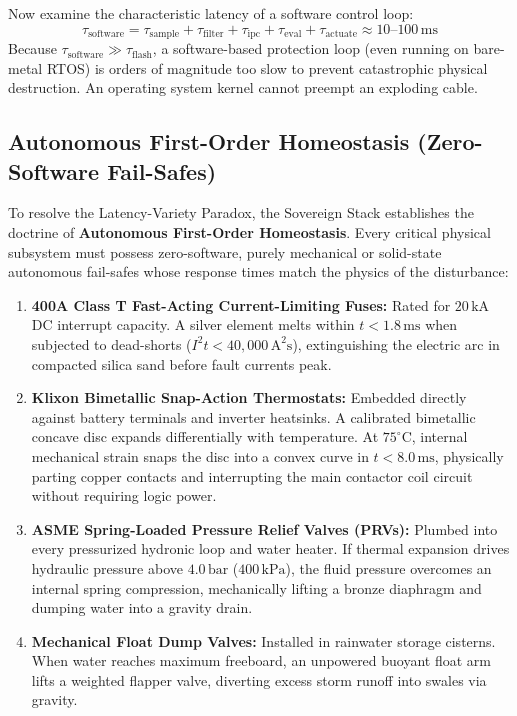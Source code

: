 Now examine the characteristic latency of a software control loop:
\begin{equation}
\tau_{\mathrm{software}} = \tau_{\mathrm{sample}} + \tau_{\mathrm{filter}} + \tau_{\mathrm{ipc}} + \tau_{\mathrm{eval}} + \tau_{\mathrm{actuate}} \approx 10\text{--}100\,\mathrm{ms}
\label{eq:software_latency}
\end{equation}
Because $\tau_{\mathrm{software}} \gg \tau_{\mathrm{flash}}$, a software-based protection loop (even running on bare-metal RTOS) is orders of magnitude too slow to prevent catastrophic physical destruction. An operating system kernel cannot preempt an exploding cable.

\subsection{Autonomous First-Order Homeostasis (Zero-Software Fail-Safes)}

To resolve the Latency-Variety Paradox, the Sovereign Stack establishes the doctrine of \textbf{Autonomous First-Order Homeostasis}. Every critical physical subsystem must possess zero-software, purely mechanical or solid-state autonomous fail-safes whose response times match the physics of the disturbance:

\begin{enumerate}
    \item \textbf{400A Class T Fast-Acting Current-Limiting Fuses:} Rated for $20\,\mathrm{kA}$ DC interrupt capacity. A silver element melts within $t < 1.8\,\mathrm{ms}$ when subjected to dead-shorts ($I^2 t < 40,000\,\mathrm{A^2 s}$), extinguishing the electric arc in compacted silica sand before fault currents peak.
    \item \textbf{Klixon Bimetallic Snap-Action Thermostats:} Embedded directly against battery terminals and inverter heatsinks. A calibrated bimetallic concave disc expands differentially with temperature. At $75^\circ\mathrm{C}$, internal mechanical strain snaps the disc into a convex curve in $t < 8.0\,\mathrm{ms}$, physically parting copper contacts and interrupting the main contactor coil circuit without requiring logic power.
    \item \textbf{ASME Spring-Loaded Pressure Relief Valves (PRVs):} Plumbed into every pressurized hydronic loop and water heater. If thermal expansion drives hydraulic pressure above $4.0\,\mathrm{bar}$ ($400\,\mathrm{kPa}$), the fluid pressure overcomes an internal spring compression, mechanically lifting a bronze diaphragm and dumping water into a gravity drain.
    \item \textbf{Mechanical Float Dump Valves:} Installed in rainwater storage cisterns. When water reaches maximum freeboard, an unpowered buoyant float arm lifts a weighted flapper valve, diverting excess storm runoff into swales via gravity.
\end{enumerate}

